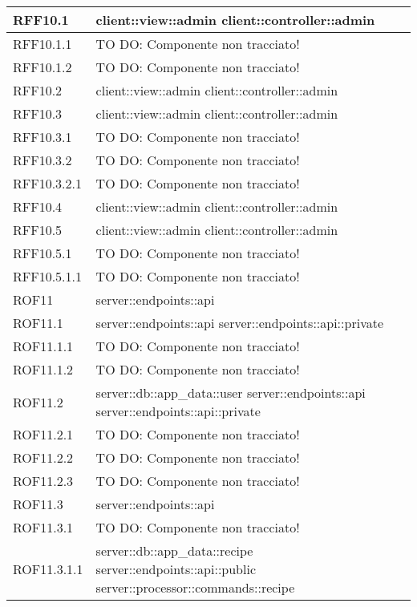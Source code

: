 \begin{center}
\begin{longtable}{| p{4cm} | p{8cm} |}
\hline
RFF10.1 & client::view::admin \newline client::controller::admin \\
\hline
RFF10.1.1 & TO DO: Componente non tracciato! \\
\hline
RFF10.1.2 & TO DO: Componente non tracciato! \\
\hline
RFF10.2 & client::view::admin \newline client::controller::admin \\
\hline
RFF10.3 & client::view::admin \newline client::controller::admin \\
\hline
RFF10.3.1 & TO DO: Componente non tracciato! \\
\hline
RFF10.3.2 & TO DO: Componente non tracciato! \\
\hline
RFF10.3.2.1 & TO DO: Componente non tracciato! \\
\hline
RFF10.4 & client::view::admin \newline client::controller::admin \\
\hline
RFF10.5 & client::view::admin \newline client::controller::admin \\
\hline
RFF10.5.1 & TO DO: Componente non tracciato! \\
\hline
RFF10.5.1.1 & TO DO: Componente non tracciato! \\
\hline
ROF11 & server::endpoints::api \\
\hline
ROF11.1 & server::endpoints::api \newline server::endpoints::api::private \\
\hline
ROF11.1.1 & TO DO: Componente non tracciato! \\
\hline
ROF11.1.2 & TO DO: Componente non tracciato! \\
\hline
ROF11.2 & server::db::app\_data::user \newline server::endpoints::api \newline server::endpoints::api::private \\
\hline
ROF11.2.1 & TO DO: Componente non tracciato! \\
\hline
ROF11.2.2 & TO DO: Componente non tracciato! \\
\hline
ROF11.2.3 & TO DO: Componente non tracciato! \\
\hline
ROF11.3 & server::endpoints::api \\
\hline
ROF11.3.1 & TO DO: Componente non tracciato! \\
\hline
ROF11.3.1.1 & server::db::app\_data::recipe \newline server::endpoints::api::public \newline server::processor::commands::recipe \\

\end{longtable}
\end{center}
